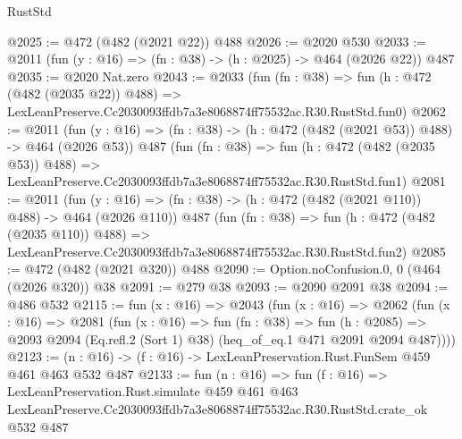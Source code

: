 \begin{lexlean}{RustStd}
\begin{coremodule}
@2025 := @472 (@482 (@2021 @22)) @488
@2026 := @2020 @530
@2033 := @2011 (fun (y : @16) => (fn : @38) -> (h : @2025) -> @464 (@2026 @22)) @487
@2035 := @2020 Nat.zero
@2043 := @2033
    (fun (fn : @38) =>
    fun (h : @472 (@482 (@2035 @22)) @488) =>
    LexLeanPreserve.Cc2030093ffdb7a3e8068874ff75532ac.R30.RustStd.fun0)
@2062 := @2011
    (fun (y : @16) => (fn : @38) -> (h : @472 (@482 (@2021 @53)) @488) -> @464 (@2026 @53))
    @487
    (fun (fn : @38) =>
    fun (h : @472 (@482 (@2035 @53)) @488) =>
    LexLeanPreserve.Cc2030093ffdb7a3e8068874ff75532ac.R30.RustStd.fun1)
@2081 := @2011
    (fun (y : @16) => (fn : @38) -> (h : @472 (@482 (@2021 @110)) @488) -> @464 (@2026 @110))
    @487
    (fun (fn : @38) =>
    fun (h : @472 (@482 (@2035 @110)) @488) =>
    LexLeanPreserve.Cc2030093ffdb7a3e8068874ff75532ac.R30.RustStd.fun2)
@2085 := @472 (@482 (@2021 @320)) @488
@2090 := Option.noConfusion.{0, 0} (@464 (@2026 @320)) @38
@2091 := @279 @38
@2093 := @2090 @2091 @38
@2094 := @486 @532
@2115 := fun (x : @16) =>
  @2043
    (fun (x : @16) =>
    @2062
      (fun (x : @16) =>
      @2081
        (fun (x : @16) =>
        fun (fn : @38) =>
        fun (h : @2085) =>
        @2093 @2094 (Eq.refl.{2} (Sort 1) @38) (heq_of_eq.{1} @471 @2091 @2094 @487))))
@2123 := (n : @16) -> (f : @16) -> LexLeanPreservation.Rust.FunSem @459 @461 @463 @532 @487
@2133 := fun (n : @16) =>
  fun (f : @16) =>
  LexLeanPreservation.Rust.simulate
    @459
    @461
    @463
    LexLeanPreserve.Cc2030093ffdb7a3e8068874ff75532ac.R30.RustStd.crate_ok
    @532
    @487
\end{coremodule}
\end{lexlean}
